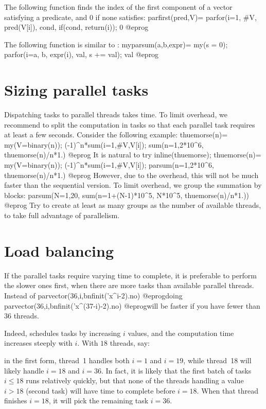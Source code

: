 The following function finds the index of the first component of a vector
satisfying a predicate, and $0$ if none satisfies:
\bprog
parfirst(pred,V)=
{
  parfor(i=1, #V,
    pred(V[i]),
    cond,
    if(cond, return(i));
  0
}
@eprog

The following function is similar to :
\bprog
myparsum(a,b,expr)=
{
  my(s = 0);
  parfor(i=a, b,
    expr(i),
    val,
    s += val);
  val
}
@eprog

\section{Sizing parallel tasks}

Dispatching tasks to parallel threads takes time. To limit overhead, we
recommend to split the computation in tasks so that each parallel task
requires at least a few seconds. Consider the following example:
\bprog
  thuemorse(n)= my(V=binary(n)); (-1)^n*sum(i=1,#V,V[i]);
  sum(n=1,2*10^6, thuemorse(n)/n*1.)
@eprog\noindent
It is natural to try
\bprog
  inline(thuemorse);
  thuemorse(n)= my(V=binary(n)); (-1)^n*sum(i=1,#V,V[i]);
  parsum(n=1,2*10^6, thuemorse(n)/n*1.)
@eprog\noindent
However, due to the overhead, this will not be much faster than the
sequential version. To limit overhead, we group the summation by blocks:
\bprog
  parsum(N=1,20, sum(n=1+(N-1)*10^5, N*10^5, thuemorse(n)/n*1.))
@eprog\noindent
Try to create at least as many groups as the number of available threads,
to take full advantage of parallelism.

\section{Load balancing}

If the parallel tasks require varying time to complete, it is preferable to
perform the slower ones first, when there are more tasks than available
parallel threads. Instead of
\bprog
  parvector(36,i,bnfinit('x^i-2).no)
@eprog\noindent doing
\bprog
  parvector(36,i,bnfinit('x^(37-i)-2).no)
@eprog\noindent will be faster if you have fewer than $36$ threads.

Indeed,  schedules tasks by increasing $i$ values, and the
computation time increases steeply with $i$. With $18$ threads, say:

\item in the first form, thread~1 handles both $i = 1$ and $i = 19$,
  while thread~18 will likely handle $i = 18$ and $i = 36$. In fact, it is
  likely that the first batch of tasks $i\leq 18$ runs relatively quickly,
  but that none of the threads  handling a value $i > 18$ (second task) will
  have time to complete before $i = 18$. When that thread finishes
  $i = 18$, it will pick the remaining task $i = 36$.

